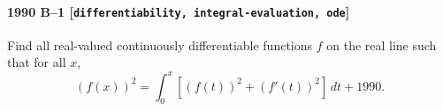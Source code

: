 \paragraph{1990 B--1 \textnormal{[\texttt{differentiability, integral-evaluation, ode}]}}
Find all real-valued continuously differentiable functions $f$
on the real line such that for all $x$,
\[
(f(x))^2 = \int_0^x [(f(t))^2 + (f'(t))^2]\,dt + 1990.
\]
